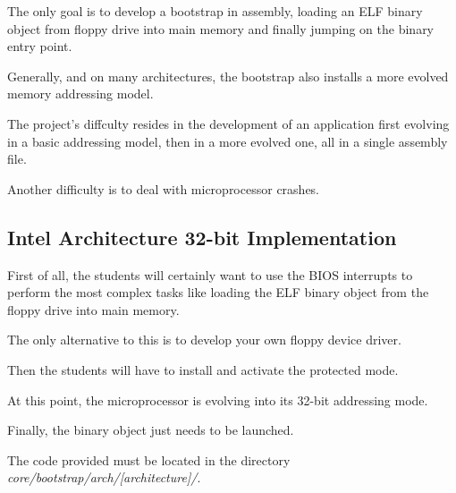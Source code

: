 The only  goal is to develop  a bootstrap in assembly,  loading an ELF
binary object from  floppy drive into main memory  and finally jumping
on the binary entry point.

Generally, and on many architectures, the bootstrap also installs
a more evolved memory addressing model.

The project's diffculty resides in the development of an
application first evolving in a basic addressing model, then in
a more evolved one, all in a single assembly file.

Another difficulty is to deal with microprocessor crashes.

%
%

\subsection{Intel Architecture 32-bit Implementation}

First of all, the students will certainly want to use the BIOS interrupts
to perform the most complex tasks like loading the ELF binary object
from the floppy drive into main memory.

The only alternative to this is to develop your own floppy device driver.

Then the students will have to install and activate the protected mode.

At this point, the microprocessor is evolving into its 32-bit addressing
mode.

Finally, the binary object just needs to be launched.

The code provided must be located in the directory
\textit{core/bootstrap/arch/[architecture]/}.
